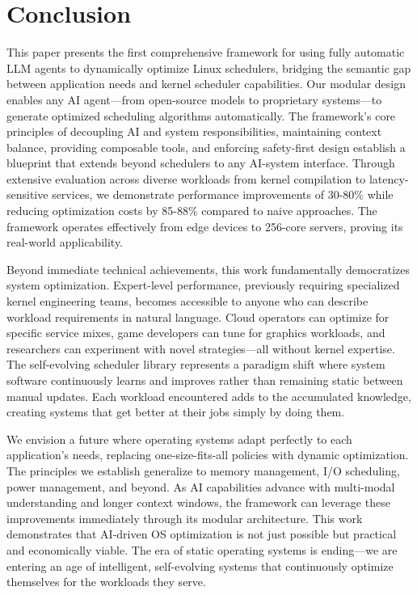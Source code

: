 \section{Conclusion}

This paper presents the first comprehensive framework for using fully automatic LLM agents to dynamically optimize Linux schedulers, bridging the semantic gap between application needs and kernel scheduler capabilities. Our modular design enables any AI agent—from open-source models to proprietary systems—to generate optimized scheduling algorithms automatically. The framework's core principles of decoupling AI and system responsibilities, maintaining context balance, providing composable tools, and enforcing safety-first design establish a blueprint that extends beyond schedulers to any AI-system interface. Through extensive evaluation across diverse workloads from kernel compilation to latency-sensitive services, we demonstrate performance improvements of 30-80\% while reducing optimization costs by 85-88\% compared to naive approaches. The framework operates effectively from edge devices to 256-core servers, proving its real-world applicability.

Beyond immediate technical achievements, this work fundamentally democratizes system optimization. Expert-level performance, previously requiring specialized kernel engineering teams, becomes accessible to anyone who can describe workload requirements in natural language. Cloud operators can optimize for specific service mixes, game developers can tune for graphics workloads, and researchers can experiment with novel strategies—all without kernel expertise. The self-evolving scheduler library represents a paradigm shift where system software continuously learns and improves rather than remaining static between manual updates. Each workload encountered adds to the accumulated knowledge, creating systems that get better at their jobs simply by doing them.

We envision a future where operating systems adapt perfectly to each application's needs, replacing one-size-fits-all policies with dynamic optimization. The principles we establish generalize to memory management, I/O scheduling, power management, and beyond. As AI capabilities advance with multi-modal understanding and longer context windows, the framework can leverage these improvements immediately through its modular architecture. This work demonstrates that AI-driven OS optimization is not just possible but practical and economically viable. The era of static operating systems is ending—we are entering an age of intelligent, self-evolving systems that continuously optimize themselves for the workloads they serve.

